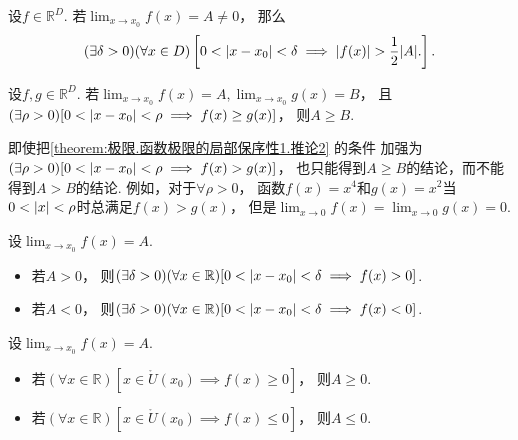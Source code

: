 \begin{corollary}\label{theorem:极限.函数极限的局部保序性1.推论1}
设\(f\in\mathbb{R}^D\).
若\(\lim_{x\to x_0} f(x) = A \neq 0\)，
那么\[
	(\exists \delta>0)
	(\forall x\in D)
	\left[
		0<\abs{x-x_0}<\delta
		\implies
		\abs{f(x)}>\frac12\abs{A}.
	\right].
\]
\end{corollary}

\begin{corollary}\label{theorem:极限.函数极限的局部保序性1.推论2}
设\(f,g\in\mathbb{R}^D\).
若\(\lim_{x\to x_0} f(x) = A,
\lim_{x\to x_0} g(x) = B\)，
且\((\exists\rho>0)[0<\abs{x-x_0}<\rho \implies f(x) \geq g(x)]\)，
则\(A \geq B\).
\end{corollary}
\begin{remark}
即使把\cref{theorem:极限.函数极限的局部保序性1.推论2} 的条件
加强为\((\exists\rho>0)[0<\abs{x-x_0}<\rho \implies f(x) > g(x)]\)，
也只能得到\(A \geq B\)的结论，而不能得到\(A > B\)的结论.
例如，对于\(\forall\rho>0\)，
函数\(f(x) = x^4\)和\(g(x) = x^2\)当\(0<\abs{x}<\rho\)时总满足\(f(x) > g(x)\)，
但是\(\lim_{x\to0} f(x) = \lim_{x\to0} g(x) = 0\).
\end{remark}


\begin{corollary}[局部保号性]\label{theorem:极限.函数极限的局部保号性1}
设\(\lim_{x \to x_0} f(x) = A\).
\begin{itemize}
	\item 若\(A>0\)，
	则\((\exists\delta>0)
	(\forall x\in\mathbb{R})
	[0<\abs{x-x_0}<\delta \implies f(x)>0]\).
	\item 若\(A<0\)，
	则\((\exists\delta>0)
	(\forall x\in\mathbb{R})
	[0<\abs{x-x_0}<\delta \implies f(x)<0]\).
\end{itemize}
\end{corollary}

\begin{corollary}\label{theorem:极限.函数极限的局部保号性3}
设\(\lim_{x \to x_0} f(x) = A\).
\begin{itemize}
	\item 若\((\forall x\in\mathbb{R})
	[x\in\mathring{U}(x_0) \implies f(x) \geq 0]\)，
	则\(A \geq 0\).
	\item 若\((\forall x\in\mathbb{R})
	[x\in\mathring{U}(x_0) \implies f(x) \leq 0]\)，
	则\(A \leq 0\).
\end{itemize}
\end{corollary}

